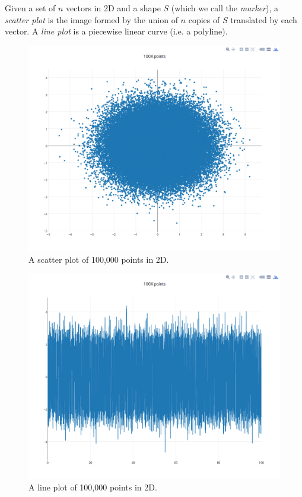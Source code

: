 \documentclass[11pt,a4paper]{article}
\begin{document}
Given a set of $n$ vectors in 2D and a shape $S$ (which we call the \emph{marker}), 
a \emph{scatter plot} is the image formed by the union of $n$ copies of $S$ translated by each vector. 
A \emph{line plot} is a piecewise linear curve (i.e. a polyline).

\begin{figure}[hbt]
  \begin{center}
    \includegraphics[scale=0.3]{scatter.png}
    \caption{A scatter plot of 100,000 points in 2D.}
    \label{scatter}
  \end{center}
\end{figure}

\begin{figure}[hbt]
  \begin{center}
    \includegraphics[scale=0.3]{line.png}
    \caption{A line plot of 100,000 points in 2D.}
    \label{line}
  \end{center}
\end{figure}
\end{document}
